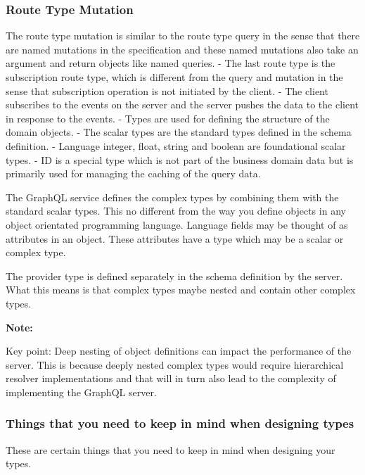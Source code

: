 \documentclass[a4paper, 11pt]{book}
\newenvironment{note}{
    \begin{siderule}
        \textbf{Note: }
        }{
    \end{siderule}
}
\begin{document}
    \subsubsection{Route Type Mutation}
    The route type mutation is similar to the route type query in the sense that there are named mutations in the specification and these named mutations also take an argument and return objects like named queries.
    - The last route type is the subscription route type, which is different from the query and mutation in the sense that subscription operation is not initiated by the client.
    - The client subscribes to the events on the server and the server pushes the data to the client in response to the events.
    - Types are used for defining the structure of the domain objects.
    - The scalar types are the standard types defined in the schema definition.
    - Language integer, float, string and boolean are foundational scalar types.
    - ID is a special type which is not part of the business domain data but is primarily used for managing the caching of the query data.

    The GraphQL service defines the complex types by combining them with the standard scalar types.
    This no different from the way you define objects in any object orientated programming language.
    Language fields may be thought of as attributes in an object.
    These attributes have a type which may be a scalar or complex type.


    The provider type is defined separately in the schema definition by the server.
    What this means is that complex types maybe nested and contain other complex types.

    \begin{note}
        Key point: Deep nesting of object definitions can impact the performance of the server. %
        This is because deeply nested complex types would require hierarchical resolver implementations and that will in turn also lead to the complexity of implementing the GraphQL server.
    \end{note}

    \subsubsection{Things that you need to keep in mind when designing types}

    These are certain things that you need to keep in mind when designing your types.
\end{document}
